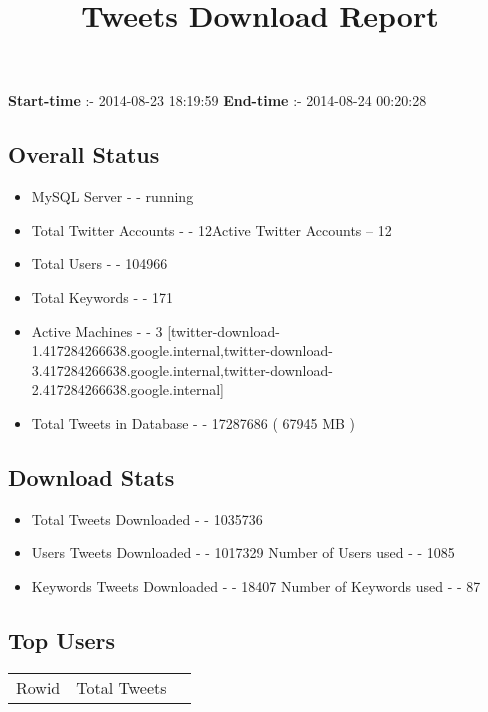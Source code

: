 \documentclass{article}\usepackage[T1]{fontenc}
\begin{document}
\title{\textbf{Tweets Download Report}}
               \date{}
                \maketitle
               \centerline{\textbf{Start-time} :- 2014-08-23 18:19:59 \hspace{40pt} \textbf{End-time} :- 2014-08-24 00:20:28}               \subsection*{Overall Status}                \begin{itemize}                \item MySQL Server - - running               \item Total Twitter Accounts - - 12\newline Active Twitter Accounts -- 12               \item Total Users - - 104966               \item Total Keywords - - 171               \item Active Machines - - 3 [twitter-download-1.417284266638.google.internal,twitter-download-3.417284266638.google.internal,twitter-download-2.417284266638.google.internal]               \item Total Tweets in Database - - 17287686 ( 67945 MB )               \end{itemize}               \subsection*{Download Stats}                \begin{itemize}                \item Total Tweets Downloaded - - 1035736               \item Users Tweets Downloaded - - 1017329 \newline Number of Users used - - 1085               \item Keywords Tweets Downloaded - - 18407 \newline Number of Keywords used - - 87              \end{itemize}              \subsection*{Top Users}\begin{tabular}{|c|c|c|}         \hline         Rowid & Total Tweets \\ 

\end{tabular}
\end{document}
